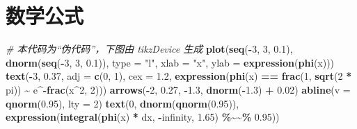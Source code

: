 \documentclass[
  b5paper,
  UTF8,twoside]{book}
\newenvironment{Shaded}{\begin{snugshade}}{\end{snugshade}}
\newcommand{\AttributeTok}[1]{\textcolor[rgb]{0.13,0.29,0.53}{#1}}
\newcommand{\CommentTok}[1]{\textcolor[rgb]{0.56,0.35,0.01}{\textit{#1}}}
\newcommand{\DecValTok}[1]{\textcolor[rgb]{0.00,0.00,0.81}{#1}}
\newcommand{\FloatTok}[1]{\textcolor[rgb]{0.00,0.00,0.81}{#1}}
\newcommand{\FunctionTok}[1]{\textcolor[rgb]{0.13,0.29,0.53}{\textbf{#1}}}
\newcommand{\NormalTok}[1]{#1}
\newcommand{\SpecialCharTok}[1]{\textcolor[rgb]{0.81,0.36,0.00}{\textbf{#1}}}
\newcommand{\StringTok}[1]{\textcolor[rgb]{0.31,0.60,0.02}{#1}}
\begin{document}
\section{数学公式}\label{sec:plotmath}

\begin{Shaded}
\begin{Highlighting}[]
\CommentTok{\# 本代码为“伪代码”，下图由 tikzDevice 生成}
\FunctionTok{plot}\NormalTok{(}\FunctionTok{seq}\NormalTok{(}\SpecialCharTok{{-}}\DecValTok{3}\NormalTok{, }\DecValTok{3}\NormalTok{, }\FloatTok{0.1}\NormalTok{), }\FunctionTok{dnorm}\NormalTok{(}\FunctionTok{seq}\NormalTok{(}\SpecialCharTok{{-}}\DecValTok{3}\NormalTok{, }\DecValTok{3}\NormalTok{, }\FloatTok{0.1}\NormalTok{)), }\AttributeTok{type =} \StringTok{"l"}\NormalTok{, }\AttributeTok{xlab =} \StringTok{"x"}\NormalTok{, }\AttributeTok{ylab =} \FunctionTok{expression}\NormalTok{(}\FunctionTok{phi}\NormalTok{(x)))}
\FunctionTok{text}\NormalTok{(}\SpecialCharTok{{-}}\DecValTok{3}\NormalTok{, }\FloatTok{0.37}\NormalTok{, }\AttributeTok{adj =} \FunctionTok{c}\NormalTok{(}\DecValTok{0}\NormalTok{, }\DecValTok{1}\NormalTok{), }\AttributeTok{cex =} \FloatTok{1.2}\NormalTok{, }
     \FunctionTok{expression}\NormalTok{(}\FunctionTok{phi}\NormalTok{(x) }\SpecialCharTok{==} \FunctionTok{frac}\NormalTok{(}\DecValTok{1}\NormalTok{, }\FunctionTok{sqrt}\NormalTok{(}\DecValTok{2} \SpecialCharTok{*}\NormalTok{ pi)) }\SpecialCharTok{\textasciitilde{}}\NormalTok{ e}\SpecialCharTok{\^{}{-}}\FunctionTok{frac}\NormalTok{(x}\SpecialCharTok{\^{}}\DecValTok{2}\NormalTok{, }\DecValTok{2}\NormalTok{)))}
\FunctionTok{arrows}\NormalTok{(}\SpecialCharTok{{-}}\DecValTok{2}\NormalTok{, }\FloatTok{0.27}\NormalTok{, }\SpecialCharTok{{-}}\FloatTok{1.3}\NormalTok{, }\FunctionTok{dnorm}\NormalTok{(}\SpecialCharTok{{-}}\FloatTok{1.3}\NormalTok{) }\SpecialCharTok{+} \FloatTok{0.02}\NormalTok{)}
\FunctionTok{abline}\NormalTok{(}\AttributeTok{v =} \FunctionTok{qnorm}\NormalTok{(}\FloatTok{0.95}\NormalTok{), }\AttributeTok{lty =} \DecValTok{2}\NormalTok{)}
\FunctionTok{text}\NormalTok{(}\DecValTok{0}\NormalTok{, }\FunctionTok{dnorm}\NormalTok{(}\FunctionTok{qnorm}\NormalTok{(}\FloatTok{0.95}\NormalTok{)), }\FunctionTok{expression}\NormalTok{(}\FunctionTok{integral}\NormalTok{(}\FunctionTok{phi}\NormalTok{(x) }\SpecialCharTok{*}\NormalTok{ dx, }\SpecialCharTok{{-}}\NormalTok{infinity, }\FloatTok{1.65}\NormalTok{) }\SpecialCharTok{\%\textasciitilde{}\textasciitilde{}\%} \FloatTok{0.95}\NormalTok{))}
\end{Highlighting}
\end{Shaded}
\end{document}
